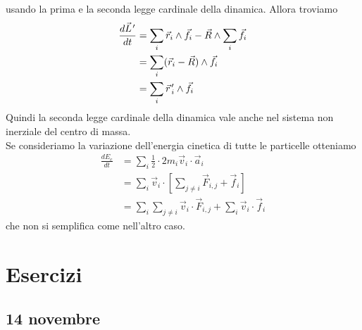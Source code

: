 \documentclass[a4paper]{article}
\begin{document}
usando la prima e la seconda legge cardinale della dinamica.
Allora troviamo
\begin{align*}
    \frac{d\pvec{L}'}{dt} &= \sum_i \vec{r}_i \wedge \vec{f}_i
    - \vec{R} \wedge \sum_i \vec{f}_i \\
    &= \sum_i (\vec{r}_i - \vec{R}) \wedge \vec{f}_i \\
    &= \sum_i \pvec{r}_i' \wedge \vec{f}_i
\end{align*}
Quindi la seconda legge cardinale della dinamica vale anche nel sistema non inerziale
del centro di massa.
\\
Se consideriamo la variazione dell'energia cinetica di tutte le particelle otteniamo
\begin{align*}
    \frac{dE_c}{dt} &= \sum_i \frac{1}{2} \cdot 2 m_i \vec{v}_i \cdot \vec{a}_i \\
    &= \sum_i \vec{v}_i \cdot \left[
        \sum_{j\neq i} \vec{F}_{i,j} + \vec{f}_i
    \right] \\
    &= \sum_i \sum_{j\neq i} \vec{v}_i \cdot \vec{F}_{i,j} + \sum_i \vec{v}_i \cdot \vec{f}_i
\end{align*}
che non si semplifica come nell'altro caso.

\pagebreak

\section{Esercizi}

\subsection{14 novembre}
\end{document}
